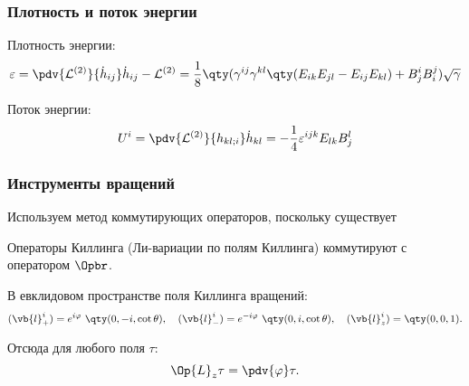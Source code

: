 \documentclass[compress]{beamer}
\begin{document}

    \begin{frame}\frametitle{Плотность и поток энергии}

        Плотность энергии:
        \begin{equation*}
            \varepsilon = \pdv{\mathcal{L}^{(2)}}{\dot{h}_{ij}} \dot{h}_{ij} - \mathcal{L}^{(2)}
                        = \frac{1}{8} \qty(
                \gamma^{ij} \gamma^{kl} \qty(
                    E_{ik} E_{jl} - E_{ij} E_{kl}
                ) + B^i_j B^j_i
            ) \sqrt{\gamma}
        \end{equation*}

        Поток энергии:
        \begin{equation*}
            U^i = \pdv{\mathcal{L}^{(2)}}{h_{kl;i}} \dot{h}_{kl}
                = -\frac{1}{4}\varepsilon^{ijk} E_{lk} B^l_j
        \end{equation*}

    \end{frame}


    \begin{frame}\frametitle{Инструменты вращений}

        Используем метод коммутирующих операторов, поскольку существует
        \begin{theorem}
            Операторы Киллинга (Ли-вариации по полям Киллинга) коммутируют с оператором $\Opbr$.
        \end{theorem}
        В евклидовом пространстве поля Киллинга вращений:
        \begin{equation*}
            (\vb{l}_{+}^i) = e^{i\varphi}\ \qty(0,-i,\cot\theta), \quad
            (\vb{l}_{-}^i) = e^{-i\varphi}\ \qty(0,i,\cot\theta), \quad
            (\vb{l}_z^i)   = \qty(0,0,1).
        \end{equation*}

        Отсюда для любого поля $\tau$:
        \begin{equation*}
            \Op{L}_z \tau = \pdv{\varphi} \tau.
        \end{equation*}

    \end{frame}
\end{document}
